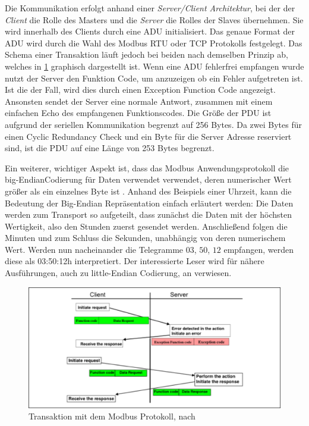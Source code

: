 Die Kommunikation erfolgt anhand einer \textit{Server/Client Architektur}, bei der der \textit{Client} die Rolle des Masters und die \textit{Server} die Rolles der Slaves übernehmen. Sie wird innerhalb des Clients durch eine ADU initialisiert. Das genaue Format der ADU wird durch die Wahl des Modbus RTU oder TCP Protokolls festgelegt. Das Schema einer Transaktion läuft jedoch bei beiden nach demselben Prinzip ab, welches in \ref{fig:modbustransaktion} graphisch dargestellt ist.
Wenn eine ADU fehlerfrei empfangen wurde nutzt der Server den Funktion Code, um anzuzeigen ob ein Fehler aufgetreten ist. Ist die der Fall, wird dies durch einen Exception Function Code angezeigt. Ansonsten sendet der Server eine normale Antwort, zusammen mit einem einfachen Echo des empfangenen Funktionscodes.
Die Größe der PDU ist aufgrund der seriellen Kommunikation begrenzt auf 256 Bytes. Da zwei Bytes für einen Cyclic Redundancy Check und ein Byte für die Server Adresse reserviert sind, ist die PDU auf eine Länge von 253 Bytes begrenzt.

Ein weiterer, wichtiger Aspekt ist, dass das Modbus Anwendungsprotokoll die \Gun big-Endian\Gob Codierung für Daten verwendet verwendet, deren numerischer Wert größer als ein einzelnes Byte ist \cite[S.~3ff.]{mod12}. 
Anhand des Beispiels einer Uhrzeit, kann die Bedeutung der Big-Endian Repräsentation einfach erläutert werden: Die Daten werden zum Transport so aufgeteilt, dass zunächst die Daten mit der höchsten Wertigkeit, also den Stunden zuerst gesendet werden. Anschließend folgen die Minuten und zum Schluss die Sekunden, unabhängig von deren numerischem Wert. Werden nun nacheinander die Telegramme $03$, $50$, $12$ empfangen, werden diese als 03:50:12h interpretiert. Der interessierte Leser wird für nähere Ausführungen, auch zu little-Endian Codierung, an \cite{endian05} verwiesen.

\begin{figure}
\centering
\includegraphics[width=\textwidth]{abbildungen/20160319_modbusclientserver}
\caption[Transaktion mit dem Modbus Protokoll]{Transaktion mit dem Modbus Protokoll, nach \cite[S.~4]{mod12}}
\label{fig:modbustransaktion}
\end{figure}

